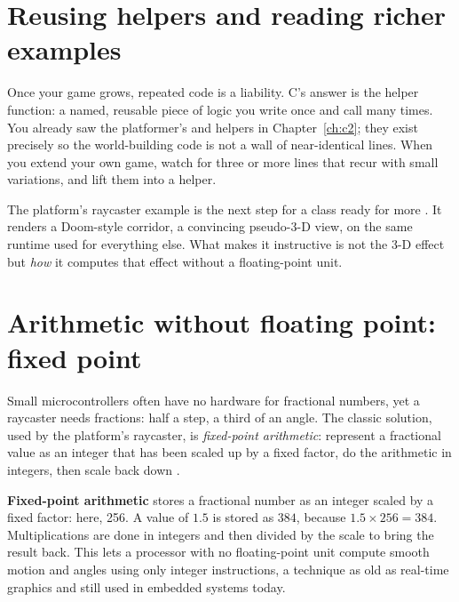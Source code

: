 \section{Reusing helpers and reading richer examples}

Once your game grows, repeated code is a liability. C's answer is the helper
function: a named, reusable piece of logic you write once and call many times. You
already saw the platformer's  and  helpers in
Chapter~\ref{ch:c2}; they exist precisely so the world-building code is not a wall
of near-identical lines. When you extend your own game, watch for three or more
lines that recur with small variations, and lift them into a helper.

The platform's raycaster example is the next step for a class ready for more
\citep{prg32teaching}. It renders a Doom-style corridor, a convincing pseudo-3-D
view, on the same \riscv runtime used for everything else. What makes it
instructive is not the 3-D effect but \emph{how} it computes that effect without a
floating-point unit.

\section{Arithmetic without floating point: fixed point}

Small microcontrollers often have no hardware for fractional numbers, yet a
raycaster needs fractions: half a step, a third of an angle. The classic solution,
used by the platform's raycaster, is \emph{fixed-point arithmetic}: represent a
fractional value as an integer that has been scaled up by a fixed factor, do the
arithmetic in integers, then scale back down \citep{prg32tutorialc,prg32repo}.



\begin{prgconcept}
\textbf{Fixed-point arithmetic} stores a fractional number as an integer scaled by
a fixed factor: here, 256. A value of $1.5$ is stored as $384$, because
$1.5\times256=384$. Multiplications are done in integers and then divided by the
scale to bring the result back. This lets a processor with no floating-point unit
compute smooth motion and angles using only integer instructions, a technique as
old as real-time graphics and still used in embedded systems today.
\end{prgconcept}

